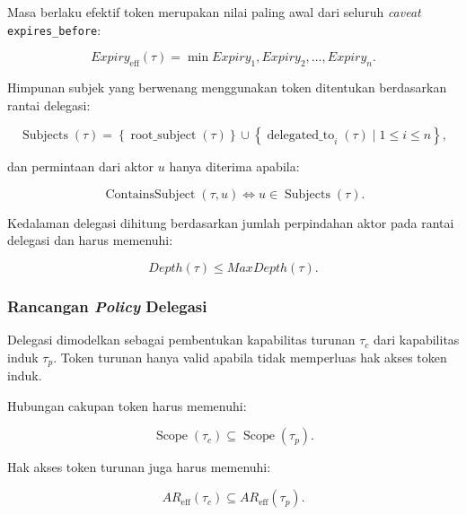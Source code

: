 Masa berlaku efektif token merupakan nilai paling awal dari seluruh \textit{caveat} \texttt{expires\_before}:

\begin{equation}
	Expiry_{\operatorname{eff}}(\tau)
	=
	\min
	{
		Expiry_1,Expiry_2,\ldots,Expiry_n
	}.
\end{equation}

Himpunan subjek yang berwenang menggunakan token ditentukan berdasarkan rantai delegasi:

\begin{equation}
	\operatorname{Subjects}(\tau)
	=
	\left\{
	\operatorname{root\_subject}(\tau)
	\right\}
	\cup
	\left\{
	\operatorname{delegated\_to}_i(\tau)
	\mid
	1 \leq i \leq n
	\right\},
\end{equation}

dan permintaan dari aktor $u$ hanya diterima apabila:

\begin{equation}
	\operatorname{ContainsSubject}(\tau,u)
	\iff
	u \in \operatorname{Subjects}(\tau).
\end{equation}

Kedalaman delegasi dihitung berdasarkan jumlah perpindahan aktor pada rantai delegasi dan harus memenuhi:

\begin{equation}
	Depth(\tau)
	\leq
	MaxDepth(\tau).
\end{equation}

\subsubsection{Rancangan \textit{Policy} Delegasi}

Delegasi dimodelkan sebagai pembentukan kapabilitas turunan $\tau_c$ dari kapabilitas induk $\tau_p$. Token turunan hanya valid apabila tidak memperluas hak akses token induk.

Hubungan cakupan token harus memenuhi:

\begin{equation}
	\operatorname{Scope}(\tau_c)
	\subseteq
	\operatorname{Scope}(\tau_p).
\end{equation}

Hak akses token turunan juga harus memenuhi:

\begin{equation}
	AR_{\operatorname{eff}}(\tau_c)
	\subseteq
	AR_{\operatorname{eff}}(\tau_p).
\end{equation}

